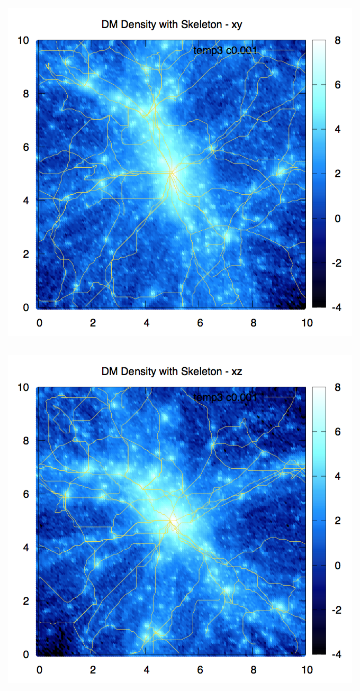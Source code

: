 \documentclass[journal]{IEEEtran}
\begin{document}
\begin{figure}[t!]
\centering
	\begin{subfigure}[t]{0.3\textwidth}
		\centering
		\includegraphics[width=\linewidth]{DMDenSkelxy.png}
	\end{subfigure}
	\quad
	\begin{subfigure}[t]{0.3\textwidth}
		\centering
		\includegraphics[width=\linewidth]{DMDenSkelxz.png}

\end{subfigure}
\end{figure}
\end{document}

